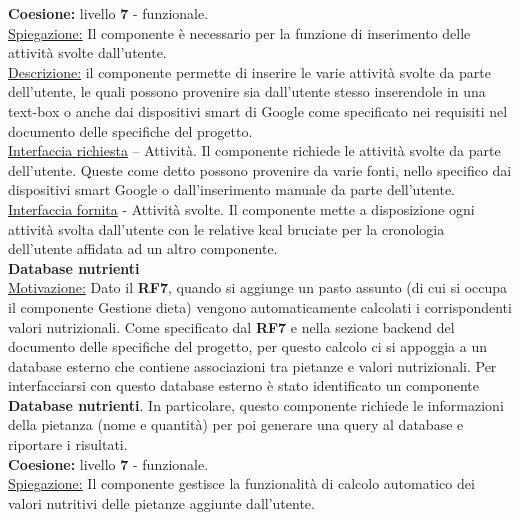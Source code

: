 \documentclass{article}
\begin{document}
      \textbf{Coesione:} livello \textbf{7} - funzionale.\\

      \underline{Spiegazione:} Il componente è necessario per la funzione di inserimento delle attività svolte dall’utente.\\

      \underline{Descrizione:} il componente permette di inserire le varie attività svolte da parte dell’utente, le quali possono provenire sia dall’utente stesso inserendole in una
      text-box o anche dai dispositivi smart di Google come specificato nei requisiti nel documento delle specifiche del progetto.\\

      \underline{Interfaccia richiesta} – Attività. Il componente richiede le attività svolte da parte dell’utente. Queste come detto possono provenire da varie fonti, nello
      specifico dai dispositivi smart Google o dall’inserimento manuale da parte dell’utente.\\

      \underline{Interfaccia fornita} - Attività svolte. Il componente mette a disposizione ogni attività svolta dall’utente con le relative kcal bruciate per la cronologia
      dell’utente affidata ad un altro componente.\\


      {\Large\textbf{Database nutrienti}}\\

      \underline{Motivazione:} Dato il \textbf{RF7}, quando si aggiunge un pasto assunto (di cui si occupa il componente Gestione dieta) vengono automaticamente calcolati i corrispondenti
      valori nutrizionali. Come specificato dal \textbf{RF7} e nella sezione backend del documento delle specifiche del progetto, per questo calcolo ci si appoggia a un database esterno che
      contiene associazioni tra pietanze e valori nutrizionali. Per interfacciarsi con questo database esterno è stato identificato un componente \textbf{Database nutrienti}. In particolare,
      questo componente richiede le informazioni della pietanza (nome e quantità) per poi generare una query al database e riportare i risultati.\\

      \textbf{Coesione:} livello \textbf{7} - funzionale.\\

      \underline{Spiegazione:} Il componente gestisce la funzionalità di calcolo automatico dei valori nutritivi delle pietanze aggiunte dall’utente.\\
\end{document}
